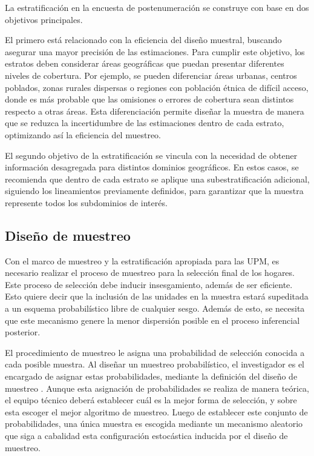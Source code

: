 \documentclass[
  12pt,
]{book}
\begin{document}
La estratificación en la encuesta de postenumeración se construye con base en dos objetivos principales.

El primero está relacionado con la eficiencia del diseño muestral, buscando asegurar una mayor precisión de las estimaciones. Para cumplir este objetivo, los estratos deben considerar áreas geográficas que puedan presentar diferentes niveles de cobertura. Por ejemplo, se pueden diferenciar áreas urbanas, centros poblados, zonas rurales dispersas o regiones con población étnica de difícil acceso, donde es más probable que las omisiones o errores de cobertura sean distintos respecto a otras áreas. Esta diferenciación permite diseñar la muestra de manera que se reduzca la incertidumbre de las estimaciones dentro de cada estrato, optimizando así la eficiencia del muestreo.

El segundo objetivo de la estratificación se vincula con la necesidad de obtener información desagregada para distintos dominios geográficos. En estos casos, se recomienda que dentro de cada estrato se aplique una subestratificación adicional, siguiendo los lineamientos previamente definidos, para garantizar que la muestra represente todos los subdominios de interés.

\subsection{Diseño de muestreo}\label{diseuxf1o-de-muestreo}

Con el marco de muestreo y la estratificación apropiada para las UPM, es necesario realizar el proceso de muestreo para la selección final de los hogares. Este proceso de selección debe inducir insesgamiento, además de ser eficiente. Esto quiere decir que la inclusión de las unidades en la muestra estará supeditada a un esquema probabilístico libre de cualquier sesgo. Además de esto, se necesita que este mecanismo genere la menor dispersión posible en el proceso inferencial posterior.

El procedimiento de muestreo le asigna una probabilidad de selección conocida a cada posible muestra. Al diseñar un muestreo probabilístico, el investigador es el encargado de asignar estas probabilidades, mediante la definición del diseño de muestreo \citep{Sarndal_Swensson_Wretman_2003}. Aunque esta asignación de probabilidades se realiza de manera teórica, el equipo técnico deberá establecer cuál es la mejor forma de selección, y sobre esta escoger el mejor algoritmo de muestreo. Luego de establecer este conjunto de probabilidades, una única muestra es escogida mediante un mecanismo aleatorio que siga a cabalidad esta configuración estocástica inducida por el diseño de muestreo.
\end{document}
